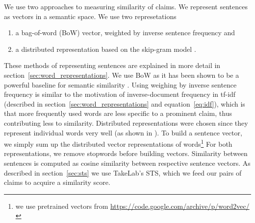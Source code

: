 We use two approaches to measuring similarity of claims. 
We represent sentences as vectors in a semantic space. 
We use two represetations 
\begin{enumerate} 
\item a bag-of-word (BoW) vector, weighted
by inverse sentence frequency and 
\item a distributed representation based on the skip-gram model
	\citep{mikolov2013distributed}. 
\end{enumerate}
These methods of representing sentences are explained in more detail in 
section~\ref{sec:word_representations}. 
We use BoW as it has been shown to be a powerful baseline for semantic similarity 
\citep{ramage2009random}. 
Using weighing by inverse sentence frequency is similar to the motivation 
of inverse-document frequency in tf-idf (described in section~\ref{sec:word_representations} and
equation~\ref{eq:idf}), which is that more frequently used words are less
specific to a prominent claim, thus contributing less to similarity. 
Distributed representations were chosen since they represent individual words 
very well (as shown in \citep{mikolov2013efficient, mikolov2013distributed}).
To build a sentence vector, we simply sum up the distributed vector representations 
of words\footnote{we use pretrained vectors from \url{https://code.google.com/archive/p/word2vec/}}
For both representations, we remove stopwords before building vectors. 
Similarity between sentences is computed as cosine similarity between 
respective sentence vectors. 
As described in section~\ref{sec:sts} we use TakeLab's STS, which we feed our pairs
of claims to acquire a similarity score. 

